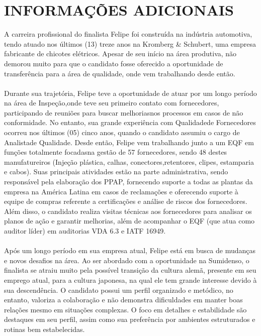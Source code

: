 \documentclass[10.5pt, a4paper]{report}
\begin{document}
\section{INFORMAÇÕES ADICIONAIS}
A carreira profissional do finalista Felipe foi construída na indústria automotiva, tendo atuado nos últimos (13) treze anos na Kromberg \& Schubert, uma empresa fabricante de chicotes elétricos. Apesar de seu início na área produtiva, não demorou muito para que o candidato fosse oferecido a oportunidade de transferência para a área de qualidade, onde vem trabalhando desde então.\\\\Durante sua trajetória, Felipe teve a oportunidade de atuar por um longo período na área de Inspeção,onde teve seu primeiro contato com fornecedores, participando de reuniões para buscar melhoriasnos processos em casos de não conformidade. No entanto, sua grande experiência com Qualidadede Fornecedores ocorreu nos últimos (05) cinco anos, quando o candidato assumiu o cargo de Analistade Qualidade. Desde então, Felipe vem trabalhando junto a um EQF em funções totalmente focadasna gestão de 57 fornecedores, sendo 48 destes manufatureiros (Injeção plástica, calhas, conectores,retentores, clipes, estamparia e cabos). Suas principais atividades estão na parte administrativa, sendo responsável pela elaboração dos PPAP, fornecendo suporte a todas as plantas da empresa na América Latina em casos de reclamações e oferecendo suporte à equipe de compras referente a certificações e análise de riscos dos fornecedores. Além disso, o candidato realiza visitas técnicas aos fornecedores para analisar os planos de ação e garantir melhorias, além de acompanhar o EQF (que atua como auditor líder) em auditorias VDA 6.3 e IATF 16949.\\\\Após um longo período em sua empresa atual, Felipe está em busca de mudanças e novos desafios na área. Ao ser abordado com a oportunidade na Sumidenso, o finalista se atraiu muito pela possível transição da cultura alemã, presente em seu emprego atual, para a cultura japonesa, na qual ele tem grande interesse devido à sua descendência. O candidato possui um perfil organizado e metódico, no entanto, valoriza a colaboração e não demonstra dificuldades em manter boas relações mesmo em situações complexas. O foco em detalhes e estabilidade são destaques em seu perfil, assim como sua preferência por ambientes estruturados e rotinas bem estabelecidas. 
\end{document}
